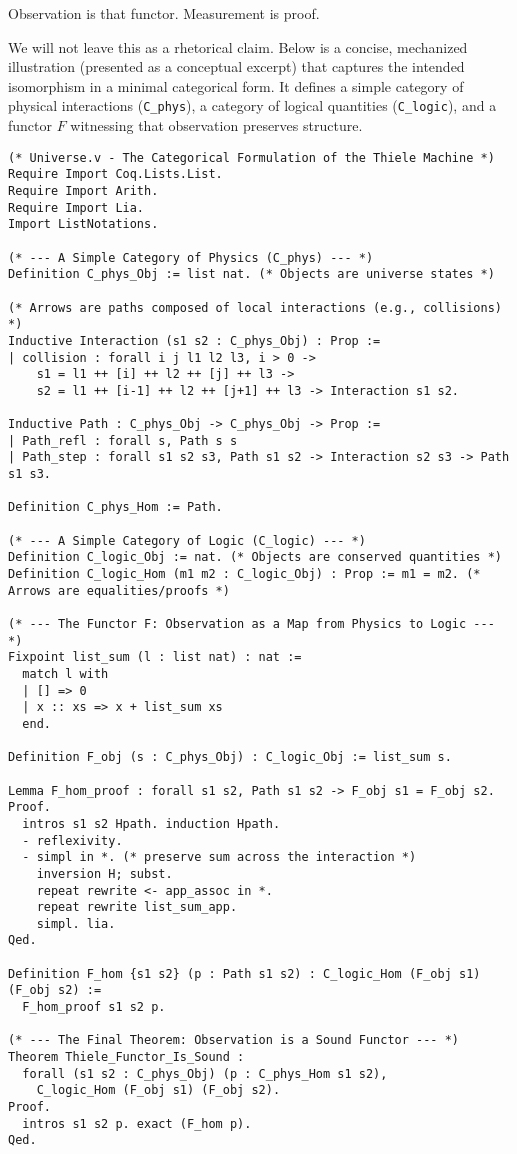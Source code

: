 \documentclass[11pt]{article}
\begin{document}
Observation is that functor. Measurement is proof.

We will not leave this as a rhetorical claim. Below is a concise, mechanized illustration (presented as a conceptual excerpt) that captures the intended isomorphism in a minimal categorical form. It defines a simple category of physical interactions (\texttt{C\_phys}), a category of logical quantities (\texttt{C\_logic}), and a functor \(F\) witnessing that observation preserves structure.

\begin{verbatim}
(* Universe.v - The Categorical Formulation of the Thiele Machine *)
Require Import Coq.Lists.List.
Require Import Arith.
Require Import Lia.
Import ListNotations.

(* --- A Simple Category of Physics (C_phys) --- *)
Definition C_phys_Obj := list nat. (* Objects are universe states *)

(* Arrows are paths composed of local interactions (e.g., collisions) *)
Inductive Interaction (s1 s2 : C_phys_Obj) : Prop :=
| collision : forall i j l1 l2 l3, i > 0 ->
    s1 = l1 ++ [i] ++ l2 ++ [j] ++ l3 ->
    s2 = l1 ++ [i-1] ++ l2 ++ [j+1] ++ l3 -> Interaction s1 s2.

Inductive Path : C_phys_Obj -> C_phys_Obj -> Prop :=
| Path_refl : forall s, Path s s
| Path_step : forall s1 s2 s3, Path s1 s2 -> Interaction s2 s3 -> Path s1 s3.

Definition C_phys_Hom := Path.

(* --- A Simple Category of Logic (C_logic) --- *)
Definition C_logic_Obj := nat. (* Objects are conserved quantities *)
Definition C_logic_Hom (m1 m2 : C_logic_Obj) : Prop := m1 = m2. (* Arrows are equalities/proofs *)

(* --- The Functor F: Observation as a Map from Physics to Logic --- *)
Fixpoint list_sum (l : list nat) : nat :=
  match l with
  | [] => 0
  | x :: xs => x + list_sum xs
  end.

Definition F_obj (s : C_phys_Obj) : C_logic_Obj := list_sum s.

Lemma F_hom_proof : forall s1 s2, Path s1 s2 -> F_obj s1 = F_obj s2.
Proof.
  intros s1 s2 Hpath. induction Hpath.
  - reflexivity.
  - simpl in *. (* preserve sum across the interaction *)
    inversion H; subst.
    repeat rewrite <- app_assoc in *.
    repeat rewrite list_sum_app.
    simpl. lia.
Qed.

Definition F_hom {s1 s2} (p : Path s1 s2) : C_logic_Hom (F_obj s1) (F_obj s2) :=
  F_hom_proof s1 s2 p.

(* --- The Final Theorem: Observation is a Sound Functor --- *)
Theorem Thiele_Functor_Is_Sound :
  forall (s1 s2 : C_phys_Obj) (p : C_phys_Hom s1 s2),
    C_logic_Hom (F_obj s1) (F_obj s2).
Proof.
  intros s1 s2 p. exact (F_hom p).
Qed.
\end{verbatim}
\end{document}
